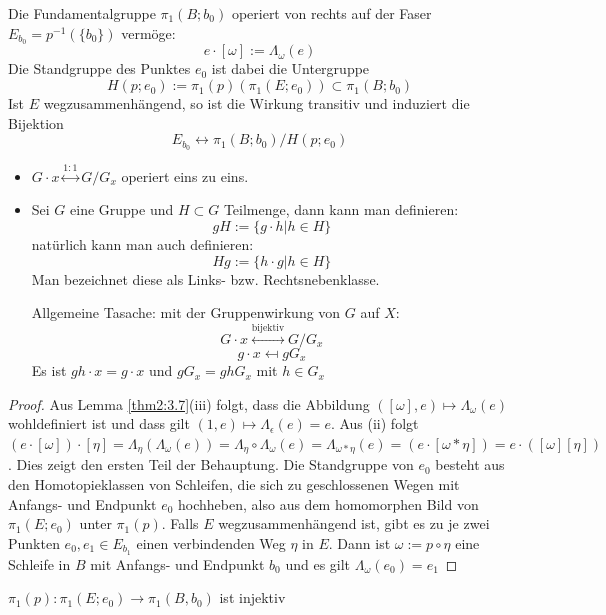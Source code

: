\documentclass[a4paper,10pt]{scrartcl}
\begin{document}
\begin{st}\label{thm2:3.8}
 Die Fundamentalgruppe $\pi_1(B; b_0)$ operiert von rechts auf der Faser $E_{b_0}=p^{-1}(\{b_0\})$ vermöge:
\[
 e\cdot [\omega] := \Lambda_\omega(e)
\]
Die Standgruppe des Punktes $e_0$ ist dabei die Untergruppe
\[
 H(p;e_0):=\pi_1(p) (\pi_1(E;e_0))\subset \pi_1(B;b_0)
\]
Ist $E$ wegzusammenhängend, so ist die Wirkung transitiv und induziert die Bijektion
\[
 E_{b_0} \leftrightarrow \pi_1(B; b_0) / H(p; e_0)
\]



\end{st}
\begin{note*}
\begin{itemize}
\item $G\cdot x \stackrel{1:1}{\leftrightarrow} G/G_x$ operiert eins zu eins.
\item Sei $G$ eine Gruppe und $H \subset G$ Teilmenge, dann kann man definieren:
\[
 gH:=\{g\cdot h|h \in H\}
\]
natürlich kann man auch definieren:
\[
 Hg:=\{h\cdot g|h\in H\}
\]
Man bezeichnet diese als Links- bzw. Rechtsnebenklasse.

\begin{seg}{Allgemeine Tasache:}
 mit der Gruppenwirkung von $G$ auf $X$:
\[
 G\cdot x \stackrel{\text{bijektiv}}{\longleftrightarrow} G/G_x
\]
\[
 g\cdot x \mapsfrom gG_x
\]
Es ist $gh\cdot x=g\cdot x$ und $gG_x=ghG_x$ mit $h\in G_x$
\end{seg}
\end{itemize}
\end{note*}
\begin{proof}
 Aus Lemma \ref{thm2:3.7}(iii) folgt, dass die Abbildung $([\omega], e)\mapsto \Lambda_\omega(e)$ wohldefiniert ist und dass gilt $(1,e) \mapsto \Lambda_\epsilon(e)=e$. Aus (ii) folgt $(e\cdot [\omega])\cdot [\eta]=\Lambda_{\eta}(\Lambda_\omega(e))=\Lambda_{\eta}\circ \Lambda_{\omega}(e)=\Lambda_{\omega*\eta}(e)=(e\cdot [\omega*\eta])=e\cdot ([\omega][\eta])$. Dies zeigt den ersten Teil der Behauptung. Die Standgruppe von $e_0$ besteht aus den Homotopieklassen von Schleifen, die sich zu geschlossenen Wegen mit Anfangs- und Endpunkt $e_0$ hochheben, also aus dem homomorphen Bild von $\pi_1(E; e_0)$ unter $\pi_1(p)$. Falls $E$ wegzusammenhängend ist, gibt es zu je zwei Punkten $e_0, e_1 \in E_{b_1}$ einen verbindenden Weg $\eta$ in $E$. Dann ist $\omega:= p \circ \eta$ eine Schleife in $B$ mit Anfangs- und Endpunkt $b_0$ und es gilt $\Lambda_{\omega}(e_0)=e_1$
\end{proof}
\begin{kor}\label{thm2:3.9}
 $\pi_1(p): \pi_1(E; e_0)\to \pi_1(B, b_0)$ ist injektiv
\end{kor}
\end{document}
